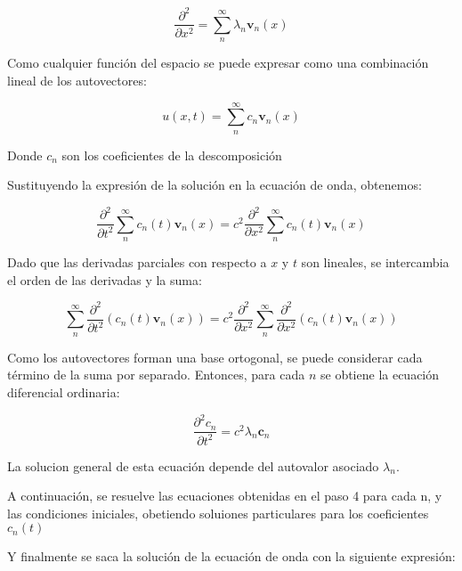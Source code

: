 \documentclass{article}
\begin{document}
    \begin{equation}
        \frac{{\partial^2 }}{{\partial x^2}} = \sum_{n}^{\infty} \lambda_n \mathbf{v}_n(x)
        \end{equation}
    
    Como cualquier función del espacio se puede expresar como una combinación lineal de los autovectores:

    \begin{equation}
        u(x, t) = \sum_{n}^{\infty} c_n \mathbf{v}_n(x)
    \end{equation} 
    
    Donde \(c_n\) son los coeficientes de la descomposición
    
    Sustituyendo la expresión de la solución en la ecuación de onda, obtenemos:

    \begin{equation}
        \frac{{\partial^2}}{{\partial t^2}}{\sum_{n}^{\infty} c_n(t) \mathbf{v}_n(x)} = c^2\frac{{\partial^2}}{{\partial x^2}}{\sum_{n}^{\infty} c_n(t) \mathbf{v}_n(x)}
    \end{equation}
    
    Dado que las derivadas parciales con respecto a $x$ y $t$ son lineales, se intercambia el orden de las derivadas y la suma:

    \begin{equation}
        {\sum_{n}^{\infty} \frac{{\partial^2}}{{\partial t^2}}(c_n(t) \mathbf{v}_n(x))} = c^2\frac{{\partial^2}}{{\partial x^2}}{\sum_{n}^{\infty}\frac{{\partial^2}}{{\partial x^2}}(c_n(t) \mathbf{v}_n(x))}
    \end{equation}
    
    Como los autovectores forman una base ortogonal, se puede considerar cada término de la suma por separado. Entonces, para cada $n$ se obtiene la ecuación diferencial ordinaria:

    \begin{equation}
        \frac{{\partial^2 c_n}}{{\partial t^2}} = c^2\lambda_n \mathbf c_n
    \end{equation}

    La solucion general de esta ecuación depende del autovalor asociado $\lambda_n$.

    A continuación, se resuelve las ecuaciones obtenidas en el paso 4 para cada n, y las condiciones iniciales, obetiendo soluiones particulares para los coeficientes $c_n(t)$

    Y finalmente se saca la solución de la ecuación de onda con la siguiente expresión:
\end{document}

